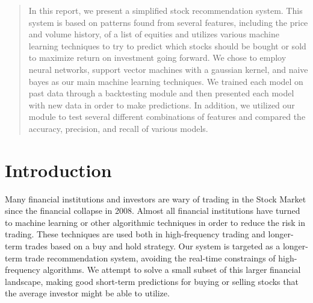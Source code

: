 \documentclass{article}
\begin{document}

\begin{abstract}
In this report, we present a simplified stock recommendation system. This system is based on patterns found from several features, including the price and volume history, of a list of equities and utilizes various machine learning techniques to try to predict which stocks should be bought or sold to maximize return on investment going forward.  We chose to employ neural networks, support vector machines with a gaussian kernel, and naive bayes as our main machine learning techniques. We trained each model on past data through a backtesting module and then presented each model with new data in order to make predictions. In addition, we utilized our module to test several different combinations of features and compared the accuracy, precision, and recall of various models.
\end{abstract}

\section{Introduction}
Many financial institutions and investors are wary of trading in the Stock Market since the financial collapse in 2008.  Almost all financial institutions have turned to machine learning or other algorithmic techniques in order to reduce the risk in trading. These techniques are used both in high-frequency trading and longer-term trades based on a buy and hold strategy. Our system is targeted as a longer-term trade recommendation system, avoiding the real-time constraings of high-frequency algorithms. We attempt to solve a small subset of this larger financial landscape, making good short-term predictions for buying or selling stocks that the average investor might be able to utilize.
\end{document}
